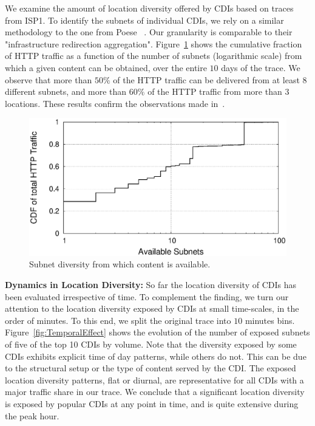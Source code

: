 We examine the amount of location diversity offered by CDIs based on traces from
ISP1.  To identify the subnets of individual CDIs, we rely on a similar
methodology to the one from Poese \etal~\cite{PADIS2010}. Our granularity is
comparable to their "infrastructure redirection
aggregation". Figure~\ref{fig:VolumeChoices} shows the cumulative fraction of
HTTP traffic as a function of the number of subnets (logarithmic scale) from
which a given content can be obtained, over the entire $10$ days of the
trace. We observe that more than $50\%$ of the HTTP traffic can be delivered
from at least $8$ different subnets, and more than $60\%$ of the HTTP traffic
from more than $3$ locations. These results confirm the observations made
in~\cite{PADIS2010}.


\begin{figure}[tbp]
\center\includegraphics[width=1\linewidth]{figures/subnetVsVolumeBucket.eps}
\caption{Subnet diversity from which content is available.}
\label{fig:VolumeChoices}
\vspace{-1.5em}
\end{figure}



\noindent\textbf{Dynamics in Location Diversity:}\label{sec:Server-Dynamics}
So far the location diversity of CDIs has been evaluated irrespective of time.
To complement the finding, we turn our attention to the location diversity
exposed by CDIs at small time-scales, \ie in the order of minutes.  To this
end, we split the original trace into $10$ minutes bins.
Figure~\ref{fig:TemporalEffect} shows the evolution of the number of exposed
subnets of five of the top 10 CDIs by volume.  Note that the diversity exposed
by some CDIs exhibits explicit time of day patterns, while others do not. This
can be due to the structural setup or the type of content served by the CDI.
The exposed location diversity patterns, \ie flat or diurnal, are
representative for all CDIs with a major traffic share in our trace. We
conclude that a significant location diversity is exposed by popular CDIs at
any point in time, and is quite extensive during the peak hour.

